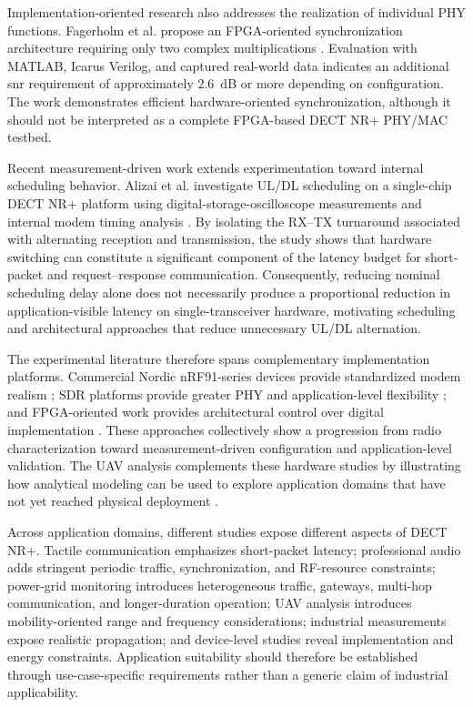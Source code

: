 Implementation-oriented research also addresses the realization of individual PHY functions. Fagerholm et al. propose an FPGA-oriented synchronization architecture requiring only two complex multiplications \cite{fagerholmFPGAbasedDECT2020New2024}. Evaluation with MATLAB, Icarus Verilog, and captured real-world data indicates an additional \gls{snr} requirement of approximately 2.6~dB or more depending on configuration. The work demonstrates efficient hardware-oriented synchronization, although it should not be interpreted as a complete FPGA-based DECT NR+ PHY/MAC testbed.

Recent measurement-driven work extends experimentation toward internal scheduling behavior. Alizai et al. investigate UL/DL scheduling on a single-chip DECT NR+ platform using digital-storage-oscilloscope measurements and internal modem timing analysis \cite{alizaiMeasurementDrivenLatencyAnalysis2026}. By isolating the RX--TX turnaround associated with alternating reception and transmission, the study shows that hardware switching can constitute a significant component of the latency budget for short-packet and request--response communication. Consequently, reducing nominal scheduling delay alone does not necessarily produce a proportional reduction in application-visible latency on single-transceiver hardware, motivating scheduling and architectural approaches that reduce unnecessary UL/DL alternation.

The experimental literature therefore spans complementary implementation platforms. Commercial Nordic nRF91-series devices provide standardized modem realism \cite{durreDECT2020NRProfessional2024, bandaraExperimentalValidationAnalysis2025, grafWhatExpectWhen2026, mudriievskyiCHEAP5GDECT2024a, piresDECT2020NREnergy2026b}; SDR platforms provide greater PHY and application-level flexibility \cite{wassmannPerformanceDECT2020NR2024, poetsProfessionalNetworkedAudio2025}; and FPGA-oriented work provides architectural control over digital implementation \cite{fagerholmFPGAbasedDECT2020New2024}. These approaches collectively show a progression from radio characterization toward measurement-driven configuration and application-level validation. The UAV analysis complements these hardware studies by illustrating how analytical modeling can be used to explore application domains that have not yet reached physical deployment \cite{jahangirAnalysisPerformanceDECT2024}.

Across application domains, different studies expose different aspects of DECT NR+. Tactile communication emphasizes short-packet latency; professional audio adds stringent periodic traffic, synchronization, and RF-resource constraints; power-grid monitoring introduces heterogeneous traffic, gateways, multi-hop communication, and longer-duration operation; UAV analysis introduces mobility-oriented range and frequency considerations; industrial measurements expose realistic propagation; and device-level studies reveal implementation and energy constraints. Application suitability should therefore be established through use-case-specific requirements rather than a generic claim of industrial applicability.


